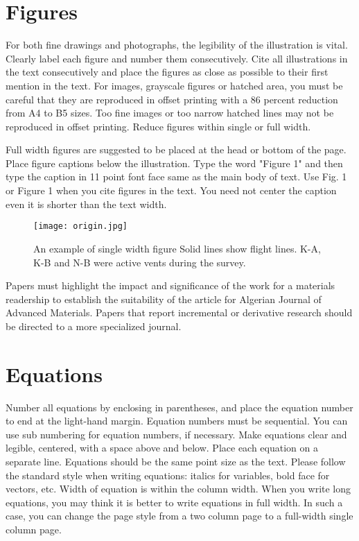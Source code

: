 \documentclass[times,twocolumn,5p]{ajam}
\begin{document}
\section{Figures}
\label{S:1}
For both fine drawings and photographs, the legibility of the illustration is vital. Clearly label each figure and number them consecutively. Cite all illustrations in the text consecutively and place the figures as close as possible to their first mention in the text. For images, grayscale figures or hatched area, you must be careful that they are reproduced in offset printing with a 86 percent reduction from A4 to B5 sizes. Too fine images or too narrow hatched lines may not be reproduced in offset printing. Reduce figures within single or full width.

Full width figures are suggested to be placed at the head or bottom of the page. Place figure captions below the illustration. Type the word "Figure 1" and then type the caption in 11 point font face same as the main body of text. Use Fig. 1 or Figure 1 when you cite figures in the text. You need not center the caption even it is shorter than the text width.

\begin{figure}[ht]\centering
\texttt{[image: origin.jpg]}
\caption{An example of single width figure
Solid lines show flight lines. K-A, K-B and N-B were active vents during the survey.}
\label{fig:view}
\end{figure}

Papers must highlight the impact and significance of the work for a materials readership to establish the suitability of the article for Algerian Journal of Advanced Materials. Papers that report incremental or derivative research should be directed to a more specialized journal.

\section{Equations}

Number all equations by enclosing in parentheses, and place the equation number to end at the light-hand margin. Equation numbers must be sequential. You can use sub numbering for equation numbers, if necessary. Make equations clear and legible, centered, with a space above and below. Place each equation on a separate line. Equations should be the same point size as the text. Please follow the standard style when writing equations: italics for variables, bold face for vectors, etc. Width of equation is within the column width. When you write long equations, you may think it is better to write equations in full width. In such a case, you can change the page style from a two column page to a full-width single column page.
\end{document}
